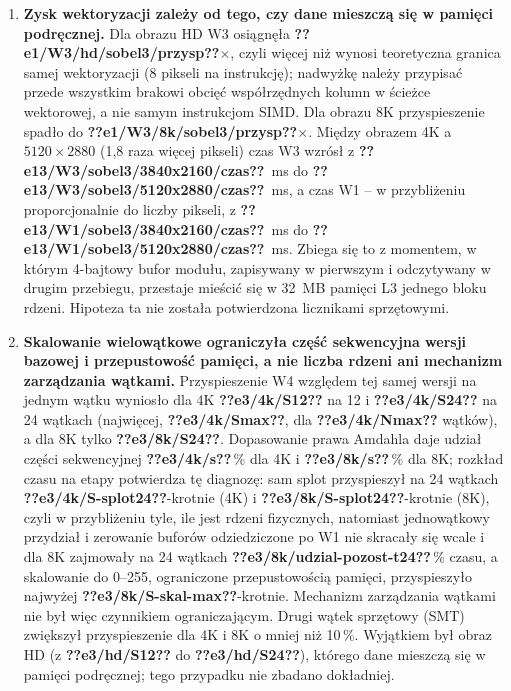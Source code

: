 \documentclass[12pt,a4paper]{article}
\providecommand{\wynik}[1]{\textbf{??#1??}}
\begin{document}
\begin{enumerate}
	\item \textbf{Zysk wektoryzacji zależy od tego, czy dane mieszczą się w pamięci podręcznej.} Dla obrazu HD W3 osiągnęła \wynik{e1/W3/hd/sobel3/przysp}$\times$, czyli więcej niż wynosi teoretyczna granica samej wektoryzacji (8 pikseli na instrukcję); nadwyżkę należy przypisać przede wszystkim brakowi obcięć współrzędnych kolumn w ścieżce wektorowej, a nie samym instrukcjom SIMD. Dla obrazu 8K przyspieszenie spadło do \wynik{e1/W3/8k/sobel3/przysp}$\times$. Między obrazem 4K a $5120\times2880$ (1,8 raza więcej pikseli) czas W3 wzrósł z \wynik{e13/W3/sobel3/3840x2160/czas}~ms do \wynik{e13/W3/sobel3/5120x2880/czas}~ms, a czas W1 -- w przybliżeniu proporcjonalnie do liczby pikseli, z \wynik{e13/W1/sobel3/3840x2160/czas}~ms do \wynik{e13/W1/sobel3/5120x2880/czas}~ms. Zbiega się to z momentem, w którym 4-bajtowy bufor modułu, zapisywany w pierwszym i odczytywany w drugim przebiegu, przestaje mieścić się w 32~MB pamięci L3 jednego bloku rdzeni. Hipoteza ta nie została potwierdzona licznikami sprzętowymi.

	\item \textbf{Skalowanie wielowątkowe ograniczyła część sekwencyjna wersji bazowej i przepustowość pamięci, a nie liczba rdzeni ani mechanizm zarządzania wątkami.} Przyspieszenie W4 względem tej samej wersji na jednym wątku wyniosło dla 4K \wynik{e3/4k/S12} na 12 i \wynik{e3/4k/S24} na 24 wątkach (najwięcej, \wynik{e3/4k/Smax}, dla \wynik{e3/4k/Nmax} wątków), a dla 8K tylko \wynik{e3/8k/S24}. Dopasowanie prawa Amdahla daje udział części sekwencyjnej \wynik{e3/4k/s}\,\% dla 4K i \wynik{e3/8k/s}\,\% dla 8K; rozkład czasu na etapy potwierdza tę diagnozę: sam splot przyspieszył na 24 wątkach \wynik{e3/4k/S-splot24}-krotnie (4K) i \wynik{e3/8k/S-splot24}-krotnie (8K), czyli w przybliżeniu tyle, ile jest rdzeni fizycznych, natomiast jednowątkowy przydział i zerowanie buforów odziedziczone po W1 nie skracały się wcale i dla 8K zajmowały na 24 wątkach \wynik{e3/8k/udzial-pozost-t24}\,\% czasu, a skalowanie do 0--255, ograniczone przepustowością pamięci, przyspieszyło najwyżej \wynik{e3/8k/S-skal-max}-krotnie. Mechanizm zarządzania wątkami nie był więc czynnikiem ograniczającym. Drugi wątek sprzętowy (SMT) zwiększył przyspieszenie dla 4K i 8K o mniej niż 10\,\%. Wyjątkiem był obraz HD (z \wynik{e3/hd/S12} do \wynik{e3/hd/S24}), którego dane mieszczą się w pamięci podręcznej; tego przypadku nie zbadano dokładniej.


\end{enumerate}
\end{document}
